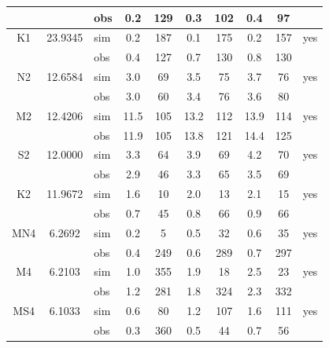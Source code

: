 \begin{table}[htb]
\begin{tabular}{|c|c|l|cc|cc|cc|c|}
\small      &        	     & \small obs & \small 0.2  & \small 129 & \small 0.3  & \small 102 & \small 0.4  & \small 97  &    	\\
\hline
\small K1   & \small 23.9345 & \small sim & \small 0.2  & \small 187 & \small 0.1  & \small 175 & \small 0.2  & \small 157 & \small yes	\\
\small      &        	     & \small obs & \small 0.4  & \small 127 & \small 0.7  & \small 130 & \small 0.8  & \small 130 &    	\\
\hline
\small N2   & \small 12.6584 & \small sim & \small 3.0  & \small 69  & \small 3.5  & \small 75  & \small 3.7  & \small 76  & \small yes	\\
\small      &        	     & \small obs & \small 3.0  & \small 60  & \small 3.4  & \small 76  & \small 3.6  & \small 80  &    	\\
\hline
\small M2   & \small 12.4206 & \small sim & \small 11.5 & \small 105 & \small 13.2 & \small 112 & \small 13.9 & \small 114 & \small yes \\
\small      &        	     & \small obs & \small 11.9 & \small 105 & \small 13.8 & \small 121 & \small 14.4 & \small 125 &    	\\
\hline
\small S2   & \small 12.0000 & \small sim & \small 3.3  & \small 64  & \small 3.9  & \small 69  & \small 4.2  & \small 70  & \small yes \\
\small      &        	     & \small obs & \small 2.9  & \small 46  & \small 3.3  & \small 65  & \small 3.5  & \small 69  &    	\\
\hline
\small K2   & \small 11.9672 & \small sim & \small 1.6  & \small 10  & \small 2.0  & \small 13  & \small 2.1  & \small 15  & \small yes \\
\small      &        	     & \small obs & \small 0.7  & \small 45  & \small 0.8  & \small 66  & \small 0.9  & \small 66  &    	\\
\hline
\small MN4  & \small 6.2692  & \small sim & \small 0.2  & \small 5   & \small 0.5  & \small 32  & \small 0.6  & \small 35  & \small yes	\\
\small      &        	     & \small obs & \small 0.4  & \small 249 & \small 0.6  & \small 289 & \small 0.7  & \small 297 &    	\\
\hline
\small M4   & \small 6.2103  & \small sim & \small 1.0  & \small 355 & \small 1.9  & \small 18  & \small 2.5  & \small 23  & \small yes	\\
\small      &        	     & \small obs & \small 1.2  & \small 281 & \small 1.8  & \small 324 & \small 2.3  & \small 332 &    	\\
\hline
\small MS4  & \small 6.1033  & \small sim & \small 0.6  & \small 80  & \small 1.2  & \small 107 & \small 1.6  & \small 111 & \small yes	\\
\small      &        	     & \small obs & \small 0.3  & \small 360 & \small 0.5  & \small 44  & \small 0.7  & \small 56  &    	\\
\hline
\end{tabular}
\end{table}

